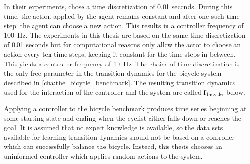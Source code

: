 In their experiments, \citeauthor{randlov_learning_1998} \cite{randlov_learning_1998} chose a time discretization of 0.01 seconds.
During this time, the action applied by the agent remains constant and after one such time step, the agent can choose a new action.
This results in a controller frequency of \SI[mode=text]{100}{\Hz}.
The experiments in this thesis are based on the same time discretization of 0.01 seconds but for computational reasons only allow the actor to choose an action every ten time steps, keeping it constant for the time steps in between.
This yields a controller frequency of \SI[mode=text]{10}{\Hz}.
The choice of time discretization is the only free parameter in the transition dynamics for the bicycle system described in \cref{cha:the_bicycle_benchmark}.
The resulting transition dynamics used for the interaction of the controller and the system are called $\operatorname{\operatorname{\mathbf{f}}_{\text{bicycle}}}$ below.

Applying a controller to the bicycle benchmark produces time series beginning at some starting state and ending when the cyclist either falls down or reaches the goal.
It is assumed that no expert knowledge is available, so the data sets available for learning transition dynamics should not be based on a controller which can successfully balance the bicycle.
Instead, this thesis chooses an uninformed controller which applies random actions to the system.

